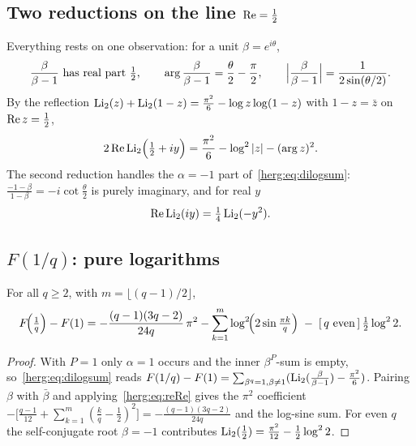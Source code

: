 \subsection{Two reductions on the line \texorpdfstring{$\operatorname{Re}=\tfrac12$}{Re=1/2}}
Everything rests on one observation: for a unit $\beta=e^{i\theta}$,
\begin{equation}\label{herg:eq:line}
  \frac{\beta}{\beta-1}\ \text{has real part}\ \tfrac12,\qquad
  \arg\frac{\beta}{\beta-1}=\frac{\theta}{2}-\frac{\pi}{2},\qquad
  \Bigl|\frac{\beta}{\beta-1}\Bigr|=\frac{1}{2\sin(\theta/2)} .
\end{equation}
By the reflection $\operatorname{Li}_2(z)+\operatorname{Li}_2(1-z)=\tfrac{\pi^2}{6}-\log z\log(1-z)$ with $1-z=\bar z$ on $\operatorname{Re} z=\tfrac12$,
\begin{equation}\label{herg:eq:reRe}
  2\operatorname{Re}\operatorname{Li}_2\Bigl(\tfrac12+iy\Bigr)=\frac{\pi^2}{6}-\log^2|z|-(\arg z)^2 .
\end{equation}
The second reduction handles the $\alpha=-1$ part of~\eqref{herg:eq:dilogsum}: $\tfrac{-1-\beta}{1-\beta}=-i\cot\tfrac\theta2$
is purely imaginary, and for real $y$
\begin{equation}\label{herg:eq:imax}
  \operatorname{Re}\operatorname{Li}_2(iy)=\tfrac14\operatorname{Li}_2(-y^2).
\end{equation}

\subsection{$F(1/q)$: pure logarithms}
\begin{theorem}\label{herg:thm:F1q}
For all $q\ge2$, with $m=\lfloor(q-1)/2\rfloor$,
\[
  F\!\Bigl(\tfrac1q\Bigr)-F(1)=-\frac{(q-1)(3q-2)}{24q}\,\pi^2
  -\sum_{k=1}^{m}\log^2\!\Bigl(2\sin\tfrac{\pi k}{q}\Bigr)\;-\;[\,q\ \mathrm{even}\,]\,\tfrac12\log^2 2 .
\]
\end{theorem}
\begin{proof}
With $P=1$ only $\alpha=1$ occurs and the inner $\beta^P$-sum is empty, so~\eqref{herg:eq:dilogsum} reads
$F(1/q)-F(1)=\sum_{\beta^q=1,\beta\neq1}(\operatorname{Li}_2(\tfrac{\beta}{\beta-1})-\tfrac{\pi^2}{6})$. Pairing $\beta$ with
$\bar\beta$ and applying~\eqref{herg:eq:reRe} gives the $\pi^2$ coefficient
$-\bigl[\tfrac{q-1}{12}+\sum_{k=1}^m(\tfrac kq-\tfrac12)^2\bigr]=-\tfrac{(q-1)(3q-2)}{24q}$ and the log-sine sum.
For even $q$ the self-conjugate root $\beta=-1$ contributes $\operatorname{Li}_2(\tfrac12)=\tfrac{\pi^2}{12}-\tfrac12\log^2 2$.
\end{proof}

